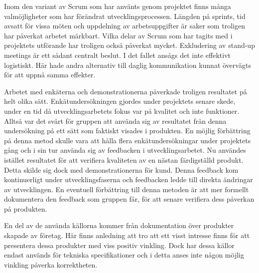 Inom den variant av Scrum som har använts genom projektet finns många valmöjligheter som har förändrat utvecklingsprocessen. Längden på sprints, tid avsatt för vissa möten och uppdelning av arbetsuppgifter är saker som troligen har påverkat arbetet märkbart. Vilka delar av Scrum som har tagits med i projektets utförande har troligen också påverkat mycket. Exkludering av stand-up meetings är ett sådant centralt beslut. I det fallet ansågs det inte effektivt logistiskt. Här hade andra alternativ till daglig kommunikation kunnat övervägts för att uppnå samma effekter.

Arbetet med enkäterna och demonstrationerna påverkade troligen resultatet på helt olika sätt. Enkätundersökningen gjordes under projektets senare skede, under en tid då utvecklingsarbetets fokus var på kvalitet och inte funktioner. Alltså var det svårt för gruppen att använda sig av resultatet från denna undersökning på ett sätt som faktiskt visades i produkten. En möjlig förbättring på denna metod skulle vara att hålla flera enkätundersökningar under projektets gång och i sin tur använda sig av feedbacken i utvecklingsarbetet. Nu användes istället resultatet för att verifiera kvaliteten av en nästan färdigställd produkt. Detta skilde sig dock med demonstrationerna för kund. Denna feedback kom kontinuerligt under utvecklingsfaserna och feedbacken ledde till direkta ändringar av utvecklingen. En eventuell förbättring till denna metoden är att mer formellt dokumentera den feedback som gruppen får, för att senare verifiera dess påverkan på produkten.

En del av de använda källorna kommer från dokumentation över produkter skapade av företag. Här finns anledning att tro att ett visst intresse finns för att presentera dessa produkter med viss positiv vinkling. Dock har dessa källor endast används för tekniska specifikationer och i detta anses inte någon möjlig vinkling påverka korrektheten.

